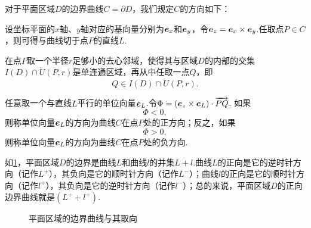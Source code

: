 \begin{definition}\label{definition:线积分与面积分.平面闭区域的边界曲线的取向}
对于平面区域\(D\)的边界曲线\(C = \partial D\)，我们规定\(C\)的方向如下：

设坐标平面的\(x\)轴、\(y\)轴对应的基向量分别为\(\boldsymbol{e}_x\)和\(\boldsymbol{e}_y\)，令\(\boldsymbol{e}_z = \boldsymbol{e}_x \times \boldsymbol{e}_y\).任取点\(P \in C\)，则可得与曲线切于点\(P\)的直线\(L\).

在点\(P\)取一个半径\(r\)足够小的去心邻域，使得其与区域\(D\)的内部的交集\(I(D) \cap \mathring{U}(P,r)\)是单连通区域，再从中任取一点\(Q\)，即\[
Q \in I(D) \cap \mathring{U}(P,r).
\]

任意取一个与直线\(L\)平行的单位向量\(\boldsymbol{e}_L\).令\(\Phi = (\boldsymbol{e}_z \times \boldsymbol{e}_L) \cdot \overrightarrow{PQ}\).
如果\[
\Phi < 0,
\]则称单位向量\(\boldsymbol{e}_L\)的方向为曲线\(C\)在点\(P\)处的正方向；反之，如果\[
\Phi > 0,
\]则称单位向量\(\boldsymbol{e}_L\)的方向为曲线\(C\)在点\(P\)处的负方向.
\end{definition}
如\cref{figure:线积分与面积分.平面区域的边界曲线与其取向}，平面区域\(D\)的边界是曲线\(L\)和曲线\(l\)的并集\(L+l\).曲线\(L\)的正向是它的逆时针方向（记作\(L^+\)），其负向是它的顺时针方向（记作\(L^-\)）；曲线\(l\)的正向是它的顺时针方向（记作\(l^+\)），其负向是它的逆时针方向（记作\(l^-\)）；总的来说，平面区域\(D\)的正向边界曲线就是\((L^+ + l^+)\).

\begin{figure}[ht]
\centering
{}
\caption{平面区域的边界曲线与其取向}
\label{figure:线积分与面积分.平面区域的边界曲线与其取向}
\end{figure}

